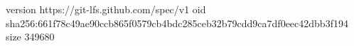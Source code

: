 version https://git-lfs.github.com/spec/v1
oid sha256:661f78c49ae90ccb865f0579cb4bdc285ceb32b79cdd9ca7df0eec42dbb3f194
size 349680
